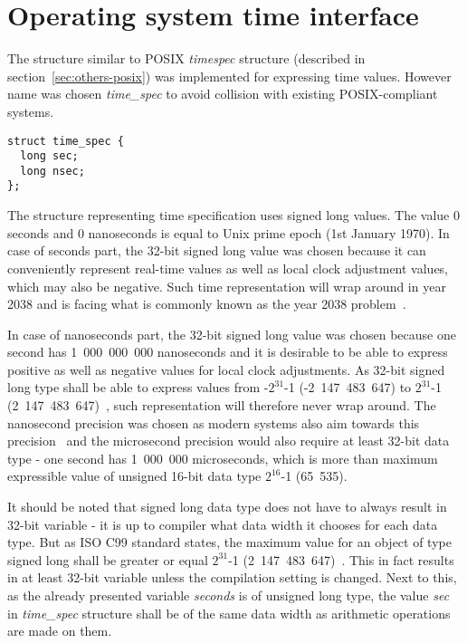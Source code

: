 
\section{Operating system time interface}
The structure similar to POSIX {\it{timespec}} structure (described in section~\ref{sec:others-posix})
was implemented for expressing time values.
However name was chosen {\it{time\_spec}} to avoid collision with existing POSIX-compliant systems.
\begin{lstlisting}
struct time_spec {
  long sec;
  long nsec;
};
\end{lstlisting}
The structure representing time specification uses signed long values.
The value 0 seconds and 0 nanoseconds is equal to Unix prime epoch (1st January 1970).
In case of seconds part, the 32-bit signed long value was chosen because
it can conveniently
represent real-time values as well as local clock adjustment values, which may also be negative.
Such time representation will wrap around in year 2038 and is facing
what is commonly known as the year 2038 problem~\cite{posix}.

In case of nanoseconds part, the 32-bit signed long value was chosen because
one second has 1~000~000~000 nanoseconds and it is
desirable to be able to express positive as well as negative values for local clock adjustments.
As 32-bit signed long type shall be able to express values from -$2^{31}$-1 (-2~147~483~647)
to $2^{31}$-1 (2~147~483~647)~\cite{c99},
such representation will therefore never wrap around.
The nanosecond precision was chosen as modern systems also aim towards this
precision~\cite{posix,ntp-precision} and
the microsecond precision would also require at least 32-bit data type -
one second has 1~000~000 microseconds, which is more than maximum expressible value of unsigned 16-bit
data type $2^{16}$-1 (65~535).

It should be noted that signed long data type does not have to always result in 32-bit variable -
it is up to compiler what data width it chooses for each data type.
But as ISO C99 standard states, the maximum value for an object of type signed long
shall be greater or equal $2^{31}$-1 (2~147~483~647)~\cite{c99}.
This in fact results in at least 32-bit variable unless the compilation setting is changed.
Next to this, as the already presented variable {\it{seconds}} is of unsigned long type,
the value {\it{sec}} in {\it{time\_spec}} structure %
shall be of the same data width as arithmetic operations are made on them.

